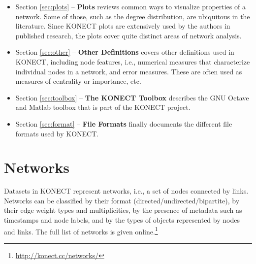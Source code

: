 \documentclass{article}
\begin{document}
\begin{itemize}
  include pairwise node measures such as distances and similarities, as
  well as node-based measures such as centralities.  Due to the focus of
  the KONECT project on such decompositions, this section quite detailed
  and complete, although the emphasis is mainly on the eigenvalue and
  singular value decompositions, and matrix to which they can be
  applied. 
\item Section \ref{sec:plots} -- \textbf{Plots} reviews common ways to
  visualize properties of a network.  Some of those, such as the degree
  distribution, are ubiquitous in the literature.  Since KONECT plots
  are extensively used by the authors in published research, the plots
  cover quite distinct areas of network analysis. 
\item Section \ref{sec:other} -- \textbf{Other Definitions} covers other
  definitions used in KONECT, including node features,
  i.e., numerical measures that characterize individual nodes in a
  network, and error measures.  These are often used as measures of centrality or
  importance, etc. 
\item Section \ref{sec:toolbox} -- \textbf{The KONECT Toolbox} describes the GNU
  Octave and Matlab toolbox that is part of the KONECT project. 
\item Section \ref{sec:format} -- \textbf{File Formats} finally documents the
  different file formats used by KONECT. 
\end{itemize}

\section{Networks}
\label{sec:taxonomy}
Datasets in KONECT represent networks, i.e., a set of nodes connected by
links. Networks can be classified by their format
(directed/undirected/bipartite), by their edge weight types and
multiplicities, by the 
presence of metadata such as timestamps and node labels, and by
the types of objects represented by nodes and links. 
The full list of networks is given
online.\footnote{\href{http://konect.cc/networks/}{http://konect.cc/networks/}}  
\end{document}
